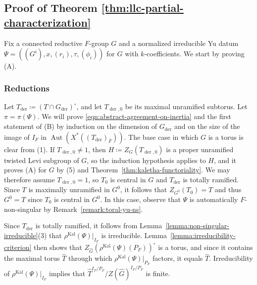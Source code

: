 \documentclass[reqno]{amsart}
\numberwithin{equation}{subsection}
\newcommand{\Q}{\mathbf{Q}}
\newcommand{\ol}[1]{\overline{#1}}
\newcommand{\wh}[1]{\widehat{#1}}
\DeclareMathOperator{\Aut}{Aut}
\DeclareMathOperator{\Kal}{Kal}
\DeclareMathOperator{\der}{der}
\theoremstyle{remark}
\numberwithin{equation}{subsection}
\numberwithin{figure}{subsection}
\begin{document}
\subsection{Proof of Theorem \ref{thm:llc-partial-characterization}}

Fix a connected reductive $F$-group $G$ and a normalized irreducible Yu datum $\Psi = ((G^i),x,(r_i),\tau,(\phi_i))$ for $G$ with $k$-coefficients. We start by proving (A).

\subsubsection{Reductions} Let $T_{\der}\coloneqq(T\cap G_{\der})^\circ$, and let $T_{\der,0}$ be its maximal unramified subtorus. Let $\pi = \pi(\Psi)$. We will prove \eqref{eqn:abstract-agreement-on-inertia} and the first statement of (B) by induction on the dimension of $G_{\mathrm{der}}$ and on the size of the image of $I_F$ in $\Aut(X^*((T_{\der})_{\ol F}))$. The base case in which $G$ is a torus is clear from (1). If $T_{\der,0}\neq1$, then $H \coloneqq Z_G(T_{\der,0})$ is a proper unramified twisted Levi subgroup of $G$, so the induction hypothesis applies to $H$, and it proves (A) for $G$ by (5) and Theorem~\ref{thm:kaletha-functoriality}. We may therefore assume $T_{\der,0}=1$, so $T_0$ is central in $G$ and $T_{\der}$ is totally ramified. Since $T$ is maximally unramified in $G^0$, it follows that $Z_{G^0}(T_0) = T$ and thus $G^0 = T$ since $T_0$ is central in $G^0$. In this case, observe that $\Psi$ is automatically $F$-non-singular by Remark~\ref{remark:toral-yu-ns}. %


Since $T_{\der}$ is totally ramified, it follows from Lemma~\ref{lemma:non-singular-irreducible}(3) that $\rho^{\Kal}(\Psi)|_{I_F}$ is irreducible. Lemma~\ref{lemma:irreducibility-criterion} then shows that $Z_{\wh G}(\rho^{\Kal}(\Psi)(P_F))^\circ$ is a torus, and since it contains the maximal torus $\wh T$ through which $\rho^{\Kal}(\Psi)|_{P_F}$ factors, it equals $\wh T$. Irreducibility of $\rho^{\Kal}(\Psi)|_{I_F}$ implies that $\wh T^{I_F/P_F}/Z(\wh G)^{I_F/P_F}$ is finite.
\end{document}
